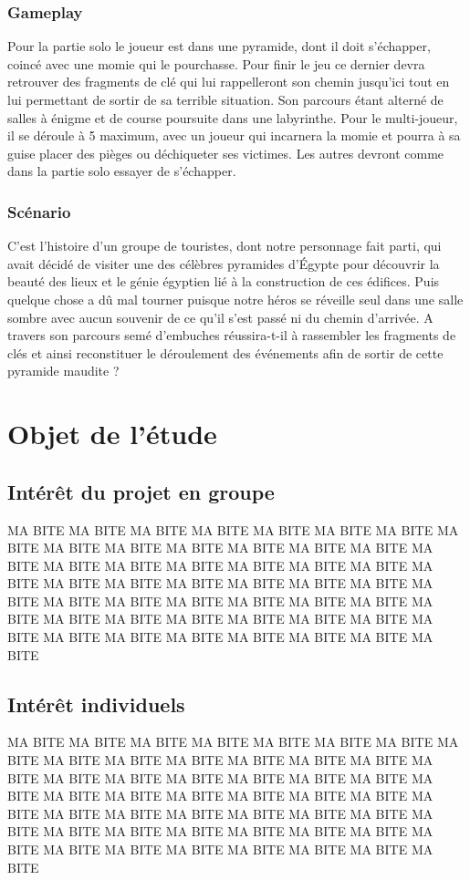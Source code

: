 \documentclass[12pt,a4paper]{article}
\begin{document}
\subsubsection{Gameplay}
Pour la partie solo le joueur est dans une pyramide, dont il doit s'échapper, coincé avec une momie qui le pourchasse. Pour finir le jeu ce dernier devra retrouver des fragments de clé qui lui rappelleront son chemin jusqu'ici tout en lui permettant de sortir de sa terrible situation. Son parcours étant alterné de salles à énigme et de course poursuite dans une labyrinthe.
Pour le multi-joueur, il se déroule à 5 maximum, avec un joueur qui incarnera la momie et pourra à sa guise placer des pièges ou déchiqueter ses victimes.
Les autres devront comme dans la partie solo essayer de s'échapper.
\subsubsection{Scénario}
C'est l'histoire d'un groupe de touristes, dont notre personnage fait parti, qui avait décidé de visiter une des célèbres pyramides d'Égypte pour découvrir la beauté des lieux et le génie égyptien lié à la construction de ces édifices. Puis quelque chose a dû mal tourner puisque notre héros se réveille seul dans une salle sombre avec aucun souvenir de ce qu'il s'est passé ni du chemin d'arrivée. A travers son parcours semé d'embuches réussira-t-il à rassembler les fragments de clés et ainsi reconstituer le déroulement des événements afin de sortir de cette pyramide maudite ?

\newpage
\section{Objet de l'étude}
\subsection{Intérêt du projet en groupe}
MA BITE MA BITE MA BITE MA BITE MA BITE MA BITE MA BITE MA BITE MA BITE MA BITE 
MA BITE MA BITE MA BITE MA BITE MA BITE MA BITE MA BITE MA BITE MA BITE MA BITE 
MA BITE MA BITE MA BITE MA BITE MA BITE MA BITE MA BITE MA BITE MA BITE MA BITE 
MA BITE MA BITE MA BITE MA BITE MA BITE MA BITE MA BITE MA BITE MA BITE MA BITE 
MA BITE MA BITE MA BITE MA BITE MA BITE MA BITE MA BITE MA BITE MA BITE MA BITE 
\subsection{Intérêt individuels}
MA BITE MA BITE MA BITE MA BITE MA BITE MA BITE MA BITE MA BITE MA BITE MA BITE 
MA BITE MA BITE MA BITE MA BITE MA BITE MA BITE MA BITE MA BITE MA BITE MA BITE 
MA BITE MA BITE MA BITE MA BITE MA BITE MA BITE MA BITE MA BITE MA BITE MA BITE 
MA BITE MA BITE MA BITE MA BITE MA BITE MA BITE MA BITE MA BITE MA BITE MA BITE 
MA BITE MA BITE MA BITE MA BITE MA BITE MA BITE MA BITE MA BITE MA BITE MA BITE 
\end{document}
